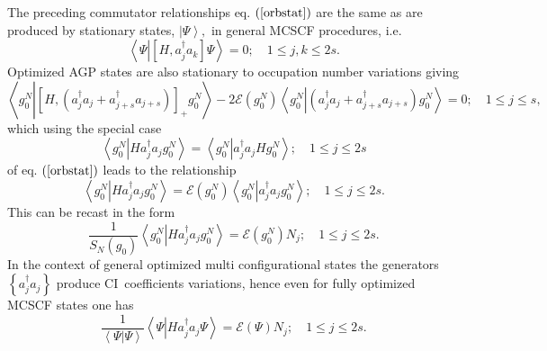 \documentclass[aps,preprint]{revtex4}%
\begin{document}
The preceding commutator relationships eq. $\left(  \ref{orbstat}\right)  $
are the same as are produced by stationary states, $\left\vert \Psi
\right\rangle ,$ in general MCSCF procedures, i.e.
\begin{equation}
\left\langle \Psi\left\vert \left[  H,a_{j}^{\dagger}a_{k}\right]
\Psi\right.  \right\rangle =0;\quad1\leq j,k\leq2s.
\end{equation}
Optimized AGP states are also stationary to occupation number variations
giving
\begin{equation}
\left\langle g_{0}^{N}\left\vert \left[  H,\left(  a_{j}^{\dagger}%
a_{j}+a_{j+s}^{\dagger}a_{j+s}\right)  \right]  _{+}g_{0}^{N}\right.
\right\rangle -2\mathcal{E}\left(  g_{0}^{N}\right)  \left\langle g_{0}%
^{N}\left\vert \left(  a_{j}^{\dagger}a_{j}+a_{j+s}^{\dagger}a_{j+s}\right)
g_{0}^{N}\right.  \right\rangle =0;\quad1\leq j\leq s,
\end{equation}
which using the special case
\begin{equation}
\left\langle g_{0}^{N}\left\vert Ha_{j}^{\dagger}a_{j}g_{0}^{N}\right.
\right\rangle =\left\langle g_{0}^{N}\left\vert a_{j}^{\dagger}a_{j}Hg_{0}%
^{N}\right.  \right\rangle ;\quad1\leq j\leq2s
\end{equation}
of eq. $\left(  \ref{orbstat}\right)  $ leads to the relationship
\begin{equation}
\left\langle g_{0}^{N}\left\vert Ha_{j}^{\dagger}a_{j}g_{0}^{N}\right.
\right\rangle =\mathcal{E}\left(  g_{0}^{N}\right)  \left\langle g_{0}%
^{N}\left\vert a_{j}^{\dagger}a_{j}g_{0}^{N}\right.  \right\rangle ;\quad1\leq
j\leq2s.
\end{equation}
This can be recast in the form
\begin{equation}
\frac{1}{S_{N}\left(  g_{0}\right)  }\left\langle g_{0}^{N}\left\vert
Ha_{j}^{\dagger}a_{j}g_{0}^{N}\right.  \right\rangle =\mathcal{E}\left(
g_{0}^{N}\right)  N_{j};\quad1\leq j\leq2s. \label{occnumstat}%
\end{equation}
In the context of general optimized multi configurational states the
generators $\left\{  a_{j}^{\dagger}a_{j}\right\}  $ produce CI\ coefficients
variations, hence even for fully optimized MCSCF states one has
\begin{equation}
\frac{1}{\left\langle \left.  \Psi\right\vert \Psi\right\rangle }\left\langle
\Psi\left\vert Ha_{j}^{\dagger}a_{j}\Psi\right.  \right\rangle =\mathcal{E}%
\left(  \Psi\right)  N_{j};\quad1\leq j\leq2s.
\end{equation}
\end{document}
